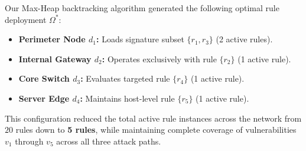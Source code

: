 \documentclass[conference]{IEEEtran}
\begin{document}
Our Max-Heap backtracking algorithm generated the following optimal rule deployment $\Omega^*$:
\begin{itemize}
    \item \textbf{Perimeter Node $d_1$:} Loads signature subset $\{r_1, r_3\}$ (2 active rules).
    \item \textbf{Internal Gateway $d_2$:} Operates exclusively with rule $\{r_2\}$ (1 active rule).
    \item \textbf{Core Switch $d_3$:} Evaluates targeted rule $\{r_4\}$ (1 active rule).
    \item \textbf{Server Edge $d_4$:} Maintains host-level rule $\{r_5\}$ (1 active rule).
\end{itemize}
This configuration reduced the total active rule instances across the network from $20$ rules down to \textbf{5 rules}, while maintaining complete coverage of vulnerabilities $v_1$ through $v_5$ across all three attack paths.

\begin{table}[t]
\caption{Comparative Inspection Performance: Uniform (5 Rules/Sensor) vs. Proposed Optimal Deployment ($\Omega^*$)}
\label{tab:comparison}
\centering
{}
\end{table}
\end{document}

